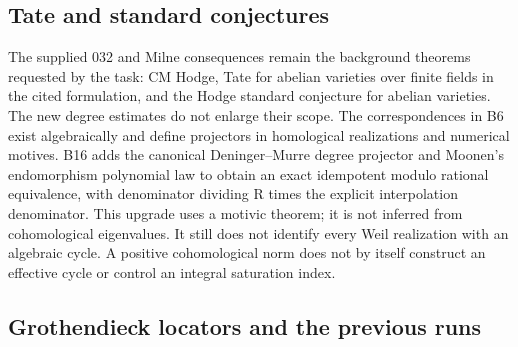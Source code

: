 \documentclass[11pt,a4paper]{article}
\theoremstyle{definition}
\begin{document}
\subsection{Tate and standard
conjectures}\label{tate-and-standard-conjectures}

The supplied 032 and Milne consequences remain the background theorems
requested by the task: CM Hodge, Tate for abelian varieties over finite
fields in the cited formulation, and the Hodge standard conjecture for
abelian varieties. The new degree estimates do not enlarge their scope.
The correspondences in B6 exist algebraically and define projectors in
homological realizations and numerical motives. B16 adds the canonical
Deninger--Murre degree projector and Moonen's endomorphism polynomial
law to obtain an exact idempotent modulo rational equivalence, with
denominator dividing R times the explicit interpolation denominator.
This upgrade uses a motivic theorem; it is not inferred from
cohomological eigenvalues. It still does not identify every Weil
realization with an algebraic cycle. A positive cohomological norm does
not by itself construct an effective cycle or control an integral
saturation index.

\subsection{Grothendieck locators and the previous
runs}\label{grothendieck-locators-and-the-previous-runs}
\end{document}
